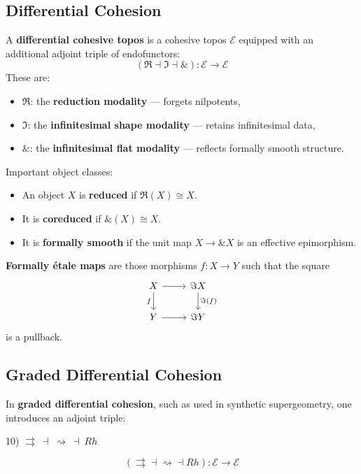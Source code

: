 \documentclass{article}
\begin{document}
\newpage
\subsection{Differential Cohesion}

A \textbf{differential cohesive topos} is a cohesive topos $\mathcal{E}$ equipped with an additional adjoint triple of endofunctors:
\[
(\Re \dashv \Im \dashv \&) : \mathcal{E} \to \mathcal{E}
\]
These are:
\begin{itemize}
  \item $\Re$: the \textbf{reduction modality} — forgets nilpotents,
  \item $\Im$: the \textbf{infinitesimal shape modality} — retains infinitesimal data,
  \item $\&$: the \textbf{infinitesimal flat modality} — reflects formally smooth structure.
\end{itemize}

Important object classes:
\begin{itemize}
  \item An object $X$ is \textbf{reduced} if $\Re(X) \cong X$.
  \item It is \textbf{coreduced} if $\&(X) \cong X$.
  \item It is \textbf{formally smooth} if the unit map $X \to \& X$ is an effective epimorphism.
\end{itemize}

\textbf{Formally étale maps} are those morphisms \( f: X \to Y \) such that the square
\[
\begin{tikzcd}
X \arrow[r] \arrow[d, "f"'] & \Im X \arrow[d, "\Im(f)"] \\
Y \arrow[r] & \Im Y
\end{tikzcd}
\]
is a pullback.

\newpage
\subsection{Graded Differential Cohesion}

In \textbf{graded differential cohesion}, such as used in synthetic supergeometry, one introduces an adjoint triple:


10) $\rightrightarrows\ \dashv\ \rightsquigarrow\ \dashv\ Rh$

\[
(\rightrightarrows \dashv \rightsquigarrow \dashv Rh) : \mathcal{E} \to \mathcal{E}
\]
\end{document}
